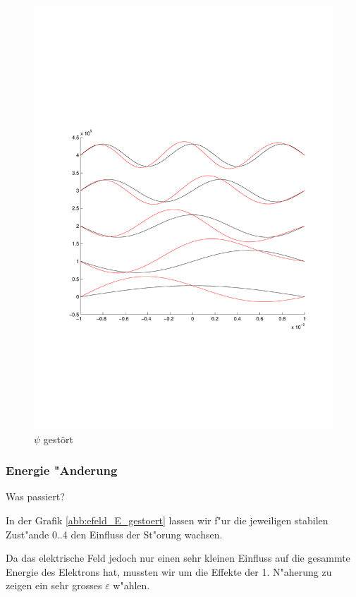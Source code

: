 \begin{refsection}
\begin{figure}
 \centering
 \includegraphics[width=12cm,clip=true,trim=2cm 7cm 1cm 8cm]{efeld/Psi_gestoert.pdf}
 \caption{$\psi$ gest\"ort}
 \label{abb:efeld_psi_gestoert}
\end{figure}




\subsubsection{Energie "Anderung}

Was passiert?

In der Grafik \ref{abb:efeld_E_gestoert} lassen wir f"ur die jeweiligen stabilen Zust"ande 0..4 
den Einfluss der St"orung wachsen.

Da das elektrische Feld jedoch nur einen sehr kleinen Einfluss auf die gesammte Energie des 
Elektrons hat, mussten wir um die Effekte der 1. N"aherung zu zeigen ein sehr grosses $\varepsilon$
w"ahlen.


\end{refsection}
